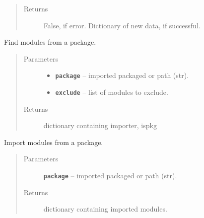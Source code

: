 \documentclass[letterpaper,10pt,english]{sphinxmanual}
\begin{document}
\begin{fulllineitems}
\begin{fulllineitems}
\begin{quote}
\begin{description}
\item[{Returns}] \leavevmode
False, if error. Dictionary of new data, if successful.

\end{description}\end{quote}

\end{fulllineitems}


\end{fulllineitems}


\begin{fulllineitems}
\label{RRtoolbox.lib:RRtoolbox.lib.config.findModules}
Find modules from a package.
\begin{quote}\begin{description}
\item[{Parameters}] \leavevmode\begin{itemize}
\item {} 
\textbf{\texttt{package}} -- imported packaged or path (str).

\item {} 
\textbf{\texttt{exclude}} -- list of modules to exclude.

\end{itemize}

\item[{Returns}] \leavevmode
dictionary containing importer, ispkg

\end{description}\end{quote}

\end{fulllineitems}


\begin{fulllineitems}
\label{RRtoolbox.lib:RRtoolbox.lib.config.getModules}
Import modules from a package.
\begin{quote}\begin{description}
\item[{Parameters}] \leavevmode
\textbf{\texttt{package}} -- imported packaged or path (str).

\item[{Returns}] \leavevmode
dictionary containing imported modules.

\end{description}\end{quote}

\end{fulllineitems}
\end{document}
